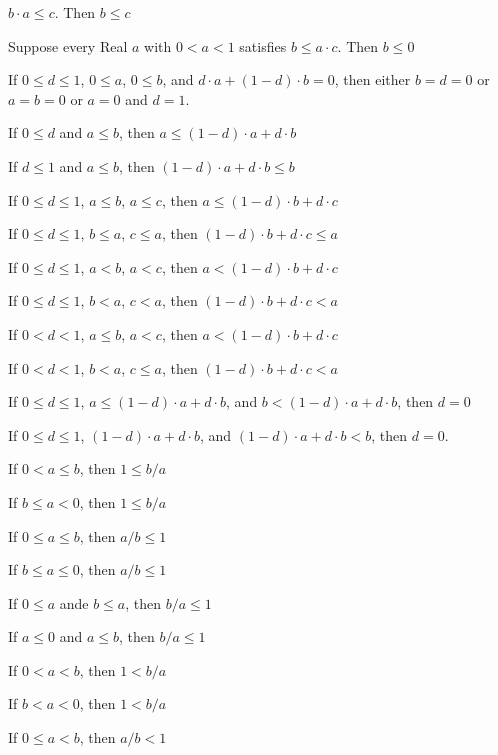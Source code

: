 \documentclass{article}
\let\xrbreak\medbreak
\begin{document}
\begin{thm}
  $b\cdot a\leq c$. Then $b\leq c$
\item\label{xreal1:169} Suppose every Real $a$ with $0<a<1$ satisfies
  $b\leq a\cdot c$. Then $b\leq 0$
\item\label{xreal1:170} If $0\leq d\leq 1$, $0\leq a$, $0\leq b$,
  and $d\cdot a+(1-d)\cdot b=0$, then either $b=d=0$ or $a=b=0$ or $a=0$
  and $d=1$.
\item\label{xreal1:171} If $0\leq d$ and $a\leq b$, then
  $a\leq(1-d)\cdot a+d\cdot b$
\item\label{xreal1:172} If $d\leq 1$ and $a\leq b$, then $(1-d)\cdot a+d\cdot b\leq b$
\item\label{xreal1:173} If $0\leq d\leq 1$, $a\leq b$, $a\leq c$,
  then $a\leq(1-d)\cdot b+d\cdot c$
\item\label{xreal1:174} If $0\leq d\leq1$, $b\leq a$, $c\leq a$, then
  $(1-d)\cdot b+d\cdot c\leq a$
\item\label{xreal1:175} If $0\leq d\leq1$, $a<b$, $a<c$,
  then $a<(1-d)\cdot b+d\cdot c$
\item\label{xreal1:176} If $0\leq d\leq 1$, $b<a$, $c<a$,
  then $(1-d)\cdot b+d\cdot c<a$
\item\label{xreal1:177} If $0<d<1$, $a\leq b$, $a<c$, then
  $a<(1-d)\cdot b+d\cdot c$
\item\label{xreal1:178} If $0<d<1$, $b<a$, $c\leq a$, then
  $(1-d)\cdot b+d\cdot c<a$
\item\label{xreal1:179} If $0\leq d\leq1$, $a\leq(1-d)\cdot a+d\cdot b$,
  and $b<(1-d)\cdot a+d\cdot b$, then $d=0$
\item\label{xreal1:180} If $0\leq d\leq1$, $(1-d)\cdot a+d\cdot b$,
  and $(1-d)\cdot a+d\cdot b<b$, then $d=0$.
  \xrbreak
\item\label{xreal1:181} If $0<a\leq b$, then $1\leq b/a$
\item\label{xreal1:182} If $b\leq a<0$, then $1\leq b/a$
\item\label{xreal1:183} If $0\leq a\leq b$, then $a/b\leq1$
\item\label{xreal1:184} If $b\leq a\leq0$, then $a/b\leq1$
\item\label{xreal1:185} If $0\leq a$ ande $b\leq a$, then $b/a\leq 1$
\item\label{xreal1:186} If $a\leq0$ and $a\leq b$, then $b/a\leq1$
\item\label{xreal1:187} If $0<a<b$, then $1<b/a$
\item\label{xreal1:188} If $b<a<0$, then $1<b/a$
\item\label{xreal1:189} If $0\leq a<b$, then $a/b<1$

\end{thm}
\end{document}
